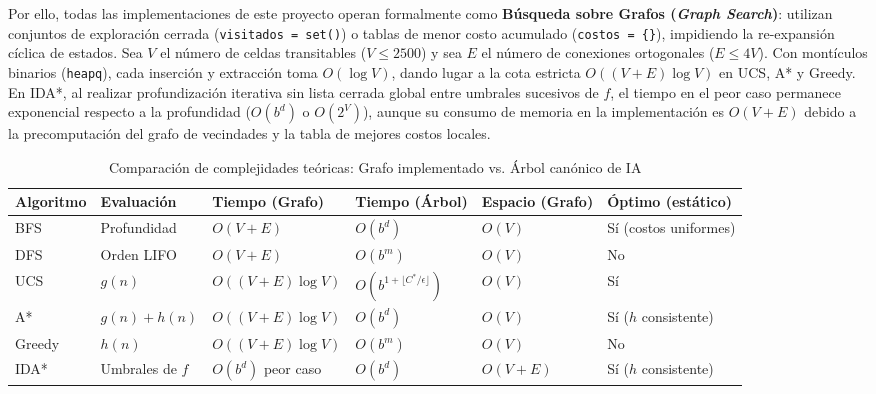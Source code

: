 \documentclass[11pt,letterpaper]{article}
\begin{document}
Por ello, todas las implementaciones de este proyecto operan formalmente como \textbf{Búsqueda sobre Grafos (\textit{Graph Search})}: utilizan conjuntos de exploración cerrada (\texttt{visitados = set()}) o tablas de menor costo acumulado (\texttt{costos = \{\}}), impidiendo la re-expansión cíclica de estados. Sea $V$ el número de celdas transitables ($V \leq 2500$) y sea $E$ el número de conexiones ortogonales ($E \leq 4V$). Con montículos binarios (\texttt{heapq}), cada inserción y extracción toma $O(\log V)$, dando lugar a la cota estricta $O((V+E)\log V)$ en UCS, A* y Greedy. En IDA*, al realizar profundización iterativa sin lista cerrada global entre umbrales sucesivos de $f$, el tiempo en el peor caso permanece exponencial respecto a la profundidad ($O(b^d)$ o $O(2^V)$), aunque su consumo de memoria en la implementación es $O(V+E)$ debido a la precomputación del grafo de vecindades y la tabla de mejores costos locales.

\begin{table}[htbp]
\centering
\caption{Comparación de complejidades teóricas: Grafo implementado vs. Árbol canónico de IA}
\footnotesize
\setlength{\tabcolsep}{4pt}
\begin{tabular}{@{}llllll@{}}
\toprule
\textbf{Algoritmo} & \textbf{Evaluación} & \textbf{Tiempo (Grafo)} & \textbf{Tiempo (Árbol)} & \textbf{Espacio (Grafo)} & \textbf{Óptimo (estático)} \\
\midrule
BFS    & Profundidad       & $O(V+E)$         & $O(b^d)$                  & $O(V)$   & Sí (costos uniformes) \\
DFS    & Orden LIFO        & $O(V+E)$         & $O(b^m)$                  & $O(V)$   & No \\
UCS    & $g(n)$            & $O((V+E)\log V)$ & $O(b^{1+\lfloor C^*/\epsilon\rfloor})$ & $O(V)$   & Sí \\
A*     & $g(n)+h(n)$       & $O((V+E)\log V)$ & $O(b^d)$                  & $O(V)$   & Sí ($h$ consistente) \\
Greedy & $h(n)$            & $O((V+E)\log V)$ & $O(b^m)$                  & $O(V)$   & No \\
IDA*   & Umbrales de $f$   & $O(b^d)$ peor caso & $O(b^d)$                & $O(V+E)$ & Sí ($h$ consistente) \\
\bottomrule
\end{tabular}
\end{table}
\end{document}
